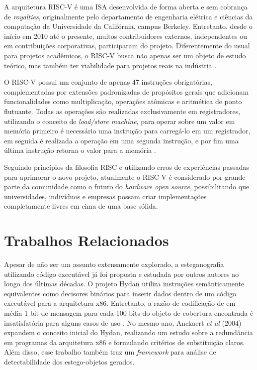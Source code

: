 A arquitetura RISC-V é uma ISA desenvolvida de forma aberta e sem cobrança de \textit{royalties}, originalmente pelo departamento de engenharia elétrica e ciências da computação da Universidade da Califórnia, campus Berkeley. Entretanto, desde o início em 2010 até o presente, muitos contribuidores externos, independentes ou em contribuições corporativas, participaram do projeto. Diferentemente do usual para projetos acadêmicos, o RISC-V busca não apenas ser um objeto de estudo teórico, mas também ter viabilidade para projetos reais na indústria \cite{Asanović:EECS-2014-146}.

O RISC-V possui um conjunto de apenas 47 instruções obrigatórias, complementadas por extensões padronizadas de propósitos gerais que adicionam funcionalidades como multiplicação, operações atômicas e aritmética de ponto flutuante. Todas as operações são realizadas exclusivamente em registradores, utilizando o conceito de \textit{load/store machine}, para operar sobre um valor em memória primeiro é necessário uma instrução para carregá-lo em um registrador, em seguida é realizada a operação em uma segunda instrução, e por fim uma última instrução retorna o valor para a memória \cite{Waterman:EECS-2014-54}.

Seguindo princípios da filosofia RISC e utilizando erros de experiências passadas para aprimorar o novo projeto, atualmente o RISC-V é considerado por grande parte da comunidade como o futuro do \textit{hardware open source}, possibilitando que universidades, indivíduos e empresas possam criar implementações completamente livres em cima de uma base sólida.

\section{Trabalhos Relacionados}

Apesar de não ser um assunto extensamente explorado, a esteganografia utilizando código executável já foi proposta e estudada por outros autores ao longo dos últimas décadas.
O projeto Hydan utiliza instruções semânticamente equivalentes como decisores binários para inserir dados dentro de um código executável para a arquitetura x86. Entretanto, a razão de codificação de em média 1 bit de mensagem para cada 100 bits do objeto de cobertura encontrada é insatisfatória para alguns casos de uso \cite{Hydan}. No mesmo ano, Anckaert \textit{et al} (2004) expandem o conceito inicial do Hydan, realizando um estudo sobre a redundância em programas da arquitetura x86 e formulando critérios de substituição claros. Além disso, esse trabalho também traz um \textit{framework} para análise de detectabilidade dos estego-objetos gerados.

